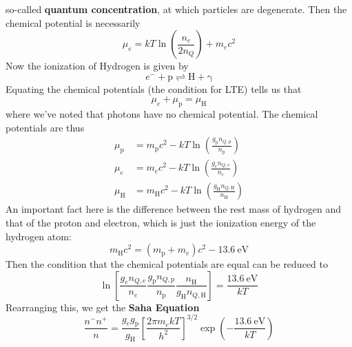 \documentclass[10pt]{article}
\numberwithin{equation}{section}
\begin{document}
    so-called \textbf{quantum concentration}, at which particles are degenerate. Then the
    chemical potential is necessarily
    \begin{equation}
      \label{eq:202}
      \boxed{\mu_e=kT\ln\left(\frac{n_e}{2n_Q}\right)+m_ec^2}
    \end{equation}
    Now the ionization of Hydrogen is given by
    \begin{equation}
      \label{eq:203}
      e^{-}+\mathrm{p\rightleftharpoons H+\gamma}
    \end{equation}
    Equating the chemical potentials (the condition for LTE) tells us
    that
    \begin{equation}
      \label{eq:204}
      \mu_e+\mu_\mathrm{p}=\mu_\mathrm{H}
    \end{equation}
    where we've noted that photons have no chemical potential. The
    chemical potentials are thus
    \begin{align}
      \label{eq:205}
      \mu_\mathrm{p} &=
      m_\mathrm{p}c^2-kT\ln\left(\frac{g_\mathrm{p}n_{Q,p}}{n_{\mathrm
{p}}}\right)\\
      \label{eq:205a}
      \mu_e &= m_ec^2-kT\ln\left(\frac{g_e n_{Q,e}}{n_e}\right)\\
      \label{eq:205b}
      \mu_\mathrm{H} &=
      m_\mathrm{H}c^2-kT\ln\left(\frac{g_\mathrm{H}n_{Q,\mathrm{H}}}{n_{\mathrm
{H}}}\right)
    \end{align}
    An important fact here is the difference between the rest mass of
    hydrogen and that of the proton and electron, which is just the
    ionization energy of the hydrogen atom:
    \begin{equation}
      \label{eq:206}
      m_\mathrm{H}c^2=(m_\mathrm{p}+m_e)c^2-13.6\ \mathrm{eV}
    \end{equation}
    Then the condition that the chemical potentials are equal can be
    reduced to
    \begin{equation}
      \label{eq:207}
      \ln\left[\frac{g_e n_{Q,e}}{n_e}\frac{g_{\mathrm{p}}
          n_{Q,\mathrm{p}}}{n_{\mathrm{p}}}\frac{n_{\mathrm{H}}}{g_
{\mathrm{H}}
          n_{Q,\mathrm{H}}}\right]=\frac{13.6\ \mathrm{eV}}{kT}
    \end{equation}
    Rearranging this, we get the \textbf{Saha Equation}
    \begin{equation}
      \label{eq:208}
      \boxed{\frac{n^-n^+}{n}=\frac{g_eg_\mathrm{p}}{g_{\mathrm{H}}}\left
[\frac{2\pi
          m_ekT}{h^2}\right]^{3/2}\exp\left(-\frac{13.6\ \mathrm{eV}}{kT}
\right)}
    \end{equation}
\end{document}
